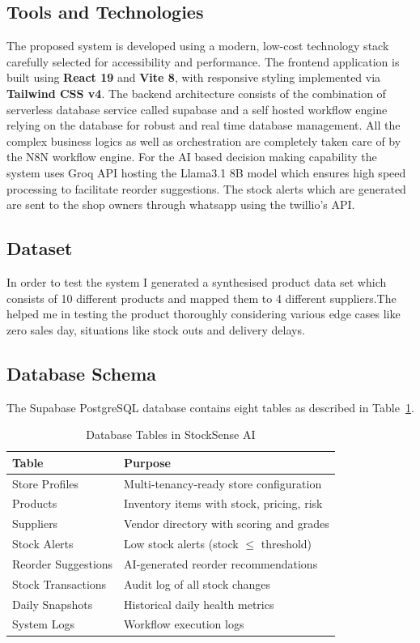 \documentclass[journal]{IEEEtran}
\begin{document}
\subsection{Tools and Technologies}
The proposed system is developed using a modern, low-cost technology stack carefully selected for accessibility and performance. The frontend application is built using \textbf{React 19} and \textbf{Vite 8}, with responsive styling implemented via \textbf{Tailwind CSS v4}. The backend architecture consists of the combination of serverless database service called supabase and a self hosted workflow engine relying on the database for robust and real time database management. All the complex business logics as well as orchestration are completely taken care of by the N8N workflow engine. For the AI based decision making capability the system uses Groq API hosting the Llama3.1 8B model which ensures high speed processing to facilitate reorder suggestions. The stock alerts which are generated are sent to the shop owners through whatsapp using the twillio's API.

\subsection{Dataset}
In order to test the system I generated a synthesised product data set which consists of 10 different products and mapped them to 4 different suppliers.The helped me in testing the product thoroughly considering various edge cases like zero sales day, situations like stock outs and delivery delays.

\subsection{Database Schema}

The Supabase PostgreSQL database contains eight tables as described in Table~\ref{tab:tables}.

\begin{table}[htbp]
\centering
\caption{Database Tables in StockSense AI}
\label{tab:tables}
\begin{tabular}{p{2.2cm}p{5.5cm}}
\toprule
\textbf{Table} & \textbf{Purpose} \\
\midrule
Store Profiles & Multi-tenancy-ready store configuration \\
Products & Inventory items with stock, pricing, risk \\
Suppliers & Vendor directory with scoring and grades \\
Stock Alerts & Low stock alerts (stock $\leq$ threshold) \\
Reorder Suggestions & AI-generated reorder recommendations \\
Stock Transactions & Audit log of all stock changes \\
Daily Snapshots & Historical daily health metrics \\
System Logs & Workflow execution logs \\
\bottomrule
\end{tabular}
\end{table}
\end{document}
